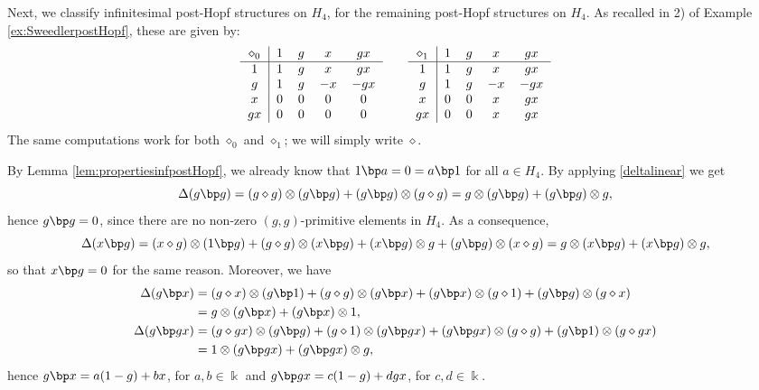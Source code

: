 \documentclass[10pt]{article}
\theoremstyle{definition}
\renewcommand{\wp}{\diamond}
\newcommand{\ot}{\otimes}
\begin{document}
Next, we classify infinitesimal post-Hopf structures on $H_{4}$, for the remaining post-Hopf structures on $H_{4}$. 
As recalled in 2) of Example \ref{ex:SweedlerpostHopf}, these are given by:
    \[
\begin{tabular}{c|cccc}
    $\wp_{0}$& $1$ & $g$ & $x$ & $gx$\\ \hline
    $1$ & $1$ & $g$ & $x$ & $gx$ \\ 
    $g$ & $1$ & $g$ & $-x$ & $-gx$ \\ 
    $x$ & $0$ & $0$ & $0$ & $0$ \\ 
    $gx$ & $0$ & $0$ & $0$ & $0$ \\ 
\end{tabular}\qquad
\begin{tabular}{c|cccc}
    $\wp_{1}$& $1$ & $g$ & $x$ & $gx$\\ \hline
    $1$ & $1$ & $g$ & $x$ & $gx$ \\ 
    $g$ & $1$ & $g$ & $-x$ & $-gx$ \\ 
    $x$ & $0$ & $0$ & $x$ & $gx$ \\ 
    $gx$ & $0$ & $0$ & $x$ & $gx$ \\ 
\end{tabular}
\]
The same computations work for both $\wp_{0}$ and $\wp_{1}$; we will simply write $\wp$. 

By Lemma \ref{lem:propertiesinfpostHopf}, we already know that $1\bp a=0=a\bp1$ for all $a\in H_{4}$. By applying \eqref{deltalinear} we get 
\[
\Delta(g\bp g)=(g\wp g)\ot(g\bp g)+(g\bp g)\ot(g\wp g)=g\ot(g\bp g)+(g\bp g)\ot g,
\]
hence $g\bp g=0$, since there are no non-zero $(g,g)$-primitive elements in $H_{4}$. As a consequence, 
\[
\Delta(x\bp g)=(x\wp g)\ot(1\bp g)+(g\wp g)\ot(x\bp g)+(x\bp g)\ot g+(g\bp g)\ot(x\wp g)=g\ot(x\bp g)+(x\bp g)\ot g,
\]
so that $x\bp g=0$ for the same reason. Moreover, we have
\begin{align*}
\Delta(g\bp x)&=(g\wp x)\ot(g\bp 1)+(g\wp g)\ot(g\bp x)+(g\bp x)\ot(g\wp 1)+(g\bp g)\ot(g\wp x)\\&=g\ot(g\bp x)+(g\bp x)\ot1, 
\\
\Delta(g\bp gx)&=(g\wp gx)\ot(g\bp g)+(g\wp 1)\ot(g\bp gx)+(g\bp gx)\ot(g\wp g)+(g\bp 1)\ot(g\wp gx)\\&=1\ot(g\bp gx)+(g\bp gx)\ot g,
\end{align*}
hence $g\bp x=a(1-g)+bx$, for $a,b\in\Bbbk$ and $g\bp gx=c(1-g)+dgx$, for $c,d\in\Bbbk$.
\end{document}
